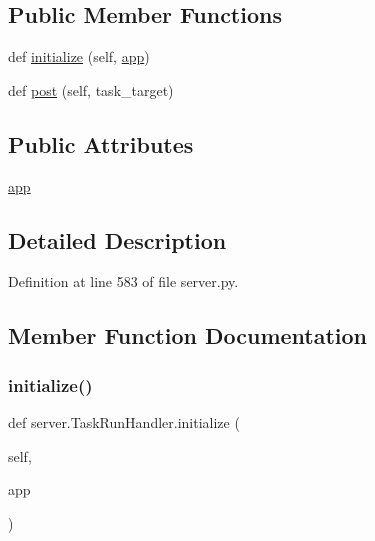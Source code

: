 \subsection*{Public Member Functions}
\begin{DoxyCompactItemize}
\item 
def \hyperlink{classserver_1_1TaskRunHandler_a3edc02cbfec1654fa11f74165a9ae2dc}{initialize} (self, \hyperlink{classserver_1_1TaskRunHandler_ab83d3c804b50f8301eefd56eb9be838f}{app})
\item 
def \hyperlink{classserver_1_1TaskRunHandler_aafdad98a65fe99f154621ec74b593d78}{post} (self, task\+\_\+target)
\end{DoxyCompactItemize}
\subsection*{Public Attributes}
\begin{DoxyCompactItemize}
\item 
\hyperlink{classserver_1_1TaskRunHandler_ab83d3c804b50f8301eefd56eb9be838f}{app}
\end{DoxyCompactItemize}


\subsection{Detailed Description}


Definition at line 583 of file server.\+py.



\subsection{Member Function Documentation}
\mbox{\label{classserver_1_1TaskRunHandler_a3edc02cbfec1654fa11f74165a9ae2dc}} 
\subsubsection{\texorpdfstring{initialize()}{initialize()}}
{\footnotesize\ttfamily def server.\+Task\+Run\+Handler.\+initialize (\begin{DoxyParamCaption}\item[{}]{self,  }\item[{}]{app }\end{DoxyParamCaption})}



